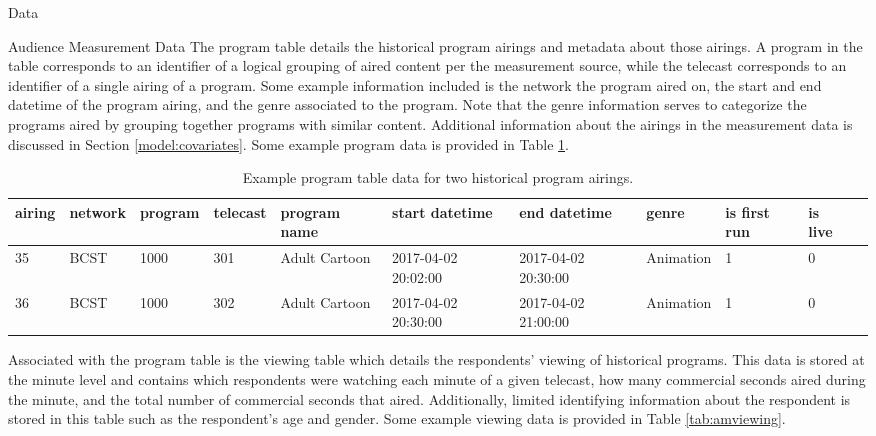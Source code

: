 \begin{chapter}{Data}
\begin{section}{Audience Measurement Data}
  The program table details the historical program airings and metadata about those airings.
  A program in the table corresponds to an identifier of a logical grouping of
  aired content per the measurement source, while the telecast corresponds
  to an identifier of a single airing of a program.
  Some example information included is the network the program aired on, the start and end datetime of the
  program airing, and the genre associated to the program.
  Note that the genre information serves to categorize the programs aired by grouping together
  programs with similar content. Additional information about the airings in the measurement data
  is discussed in Section \ref{model:covariates}.
  Some example program data is provided in Table \ref{tab:amprogram}.

  \begin{table}[h!]
    \centering
    \begin{adjustbox}{width=1.1\textwidth,center=\textwidth}
      \large
      \begin{tabular}{lllllllllll}
        airing & network & program & telecast & program name & start datetime & end datetime & genre & is first run & is live\\
        \hline
        35 & BCST & 1000 & 301 & Adult Cartoon & 2017-04-02 20:02:00 & 2017-04-02 20:30:00 & Animation & 1 & 0 \\
        36 & BCST & 1000 & 302 & Adult Cartoon & 2017-04-02 20:30:00 & 2017-04-02 21:00:00 & Animation & 1 & 0
      \end{tabular}
    \end{adjustbox}
    \caption{Example program table data for two historical program airings.}\label{tab:amprogram}
  \end{table}

  Associated with the program table is the viewing table which details the respondents' viewing of
  historical programs. This data is stored at the minute level and contains
  which respondents were watching each minute of a given telecast, how many commercial seconds aired
  during the minute, and the total number of commercial seconds that aired.
  Additionally, limited identifying information about the
  respondent is stored in this table such as the respondent's age and gender.
  Some example viewing data is provided in Table \ref{tab:amviewing}.


\end{section}
\end{chapter}
